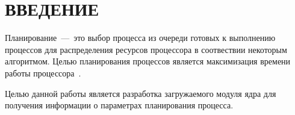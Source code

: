 \section*{\centering ВВЕДЕНИЕ}

Планирование~---~это выбор процесса из очереди готовых к выполнению процессов для распределения ресурсов процессора в соотвествии некоторым алгоритмом.
Целью планирования процессов является максимизация времени работы процессора~\cite{linux_scheduler}.

Целью данной работы является разработка загружаемого модуля ядра для получения информации о параметрах планирования процесса.